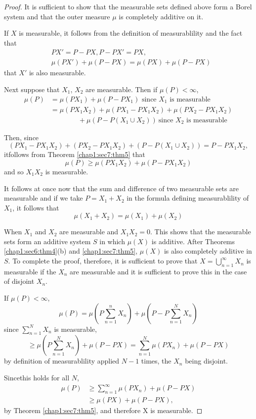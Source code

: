 \begin{proof}
  It is sufficient to show that the
  measurable sets defined above form a Borel system and that the
  outer measure $\mu$ is completely additive on it. 
 
 If $X$ is measurable, it follows from the definition of measurablility
 and the fact that 
\begin{align*}
  & PX' = P - PX, P - PX' =PX,\\
  & \mu (PX')+ \mu (P-PX) = \mu (PX)+ \mu (P-PX)
\end{align*}
that $X'$ is also measurable.
 
 Next suppose that $X_1$, $X_2$ are measurable. Then if $\mu (P)<\infty$,
 \begin{align*}
 \mu (P) &= \mu (PX_1)+ \mu (P-PX_1) \text{ since } X_1 \text{ is measurable}\\
 & = \mu (PX_1X_2) + \mu (PX_1-PX_1X_2) + \mu (PX_2-PX_1X_2)\\ 
 & \qquad \qquad + \mu(P-P(X_1 \cup X_2)) ~\text{since $X_2$ is measurable}
 \end{align*}

Then, since
$$ 
(PX_1-PX_1X_2)+ (PX_2-PX_1X_2)+ (P-P(X_1 \cup X_2))=P-PX_1X_2,
$$
it\pageoriginale follows from Theorem \ref{chap1:sec7:thm5} that
$$ 
\mu (P) \geq \mu (PX_1 X_2) + \mu (P- PX_1 X_2)
$$
and so $X_1 X_2$ is measurable.

It follows at once now that the sum and difference of two measurable
sets are measurable and if we take $ P = X_1 + X_2$ in the formula
defining measurablility of  $ X_1 $, it follows that 
$$ 
\mu (X_1 + X_2)= \mu (X_1) + \mu (X_2)
$$

When $X_1$ and $X_2$ are measurable and $X_1 X_2 = 0$. This shows that
the measurable sets form an additive system $S$ in which $\mu(X)$ is
additive. After Theorems \ref{chap1:sec6:thm4}(b)
and \ref{chap1:sec7:thm5}, $\mu (X)$ is also completely 
additive in $S$. To complete the proof, therefore, it is sufficient to
prove that $X = \bigcup\limits_{n =1}^{\infty} X_n$ is measurable if
the $X_n$ are measurable and it is sufficient to prove this in the
case of disjoint $X_n$. 

If $\mu (P) < \infty$,
$$
\mu (P) = \mu \left(P \sum_{n=1}^{n}X_n\right) + \mu \left(P - P
\sum^{N}_{n=1} X_n\right)
$$
since $\sum\limits^{N}_{n=1} X_n$ is measurable,
$$
\geq \mu \left(P \sum^{N}_{n=1} X_n\right) + \mu (P- PX)
= \sum^{N}_{n=1} \mu (PX_n) + \mu (P - PX)
$$
by definition of measurablility applied $N-1$ times, the $X_n$ being disjoint.

Since\pageoriginale this holds for all $N$,
\begin{align*}
\mu (P) & \geq \sum^{\infty}_{n=1} \mu (PX_n) + \mu (P- PX)\\
        &\geq \mu (PX) + \mu (P- PX),
\end{align*}
by Theorem \ref{chap1:sec7:thm5}, and therefore X is measurable.
\end{proof}

